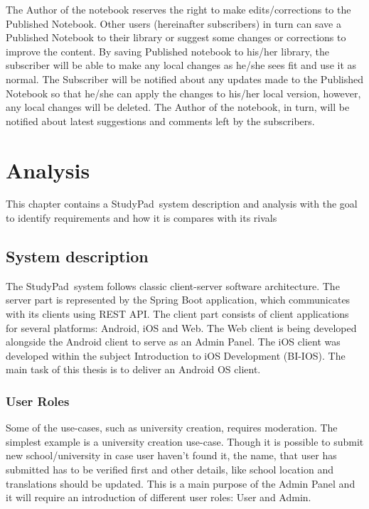 \documentclass[thesis=B,english]{FITthesis}[2012/10/20]
\newcommand{\appname}{StudyPad}
\begin{document}
The Author of the notebook reserves the right to make edits/corrections to the Published Notebook. Other users (hereinafter subscribers) in turn can save a Published Notebook to their library or suggest some changes or corrections to improve the content. By saving Published notebook to his/her library, the subscriber will be able to make any local changes as he/she sees fit and use it as normal. The Subscriber will be notified about any updates made to the Published Notebook so that he/she can apply the changes to his/her local version, however, any local changes will be deleted. The Author of the notebook, in turn, will be notified about latest suggestions and comments left by the subscribers.

\chapter{Analysis}
This chapter contains a \appname\ system description and analysis with the goal to identify requirements and how it is compares with its rivals


\section{System description}

The \appname\ system follows classic client-server software architecture. The server part is represented by the Spring Boot application, which communicates with its clients using REST API. The client part consists of client applications for several platforms: Android, iOS and Web. The Web client is being developed alongside the Android client to serve as an Admin Panel.\cite{studypad-web} The iOS client was developed within the subject Introduction to iOS Development (BI-IOS). \cite{studypad-ios} The main task of this thesis is to deliver an Android OS client.

\subsection{User Roles}
Some of the use-cases, such as university creation, requires moderation. The simplest example is a university creation use-case. Though it is possible to submit new school/university in case user haven't found it, the name, that user has submitted has to be verified first and other details, like school location and translations should be updated. This is a main purpose of the Admin Panel and it will require an introduction of different user roles: User and Admin. 
\end{document}
